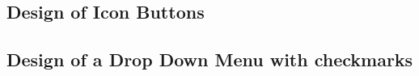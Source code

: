 \documentclass{scrreprt}
\begin{document}
\subsection{Design of Icon Buttons}\label{cap:Designprinciples_IconButtons}

\subsection{Design of a Drop Down Menu with checkmarks}\label{cap:Designprinciples_dropDownMenusWithCheckmark}










\printglossaries
\end{document}
